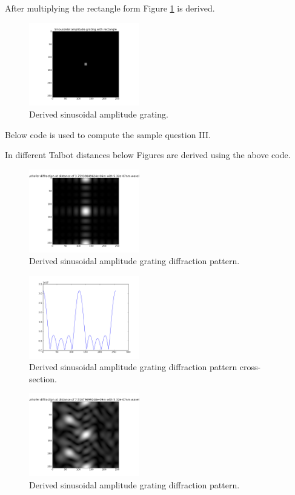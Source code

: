 \documentclass[journal,9pt]{IEEEtran}
\begin{document}
After multiplying the rectangle form Figure \ref{fig:sinam} is derived.

\begin{figure}[H]
\centering
\includegraphics[width=1.9in]{sinam}
\caption{Derived sinusoidal amplitude grating.}
\label{fig:sinam}
\end{figure}

Below code is used to compute the sample question III.
\lstset{language=Python,breaklines=true}


In different Talbot distances below Figures are derived using the above code.

\begin{figure}[H]
\centering
\includegraphics[width=1.9in]{q3d1}
\caption{Derived sinusoidal amplitude grating diffraction pattern.}
\label{fig:q3d1}
\end{figure}

\begin{figure}[H]
\centering
\includegraphics[width=1.9in]{q3s1}
\caption{Derived sinusoidal amplitude grating diffraction pattern cross-section.}
\label{fig:q3s1}
\end{figure}

\begin{figure}[H]
\centering
\includegraphics[width=1.9in]{q3d2}
\caption{Derived sinusoidal amplitude grating diffraction pattern.}
\label{fig:q3d2}
\end{figure}
\end{document}
